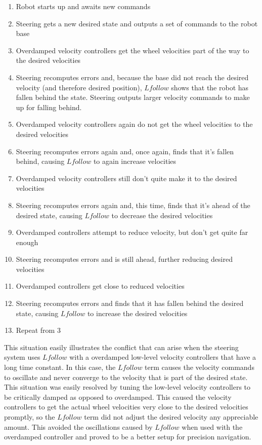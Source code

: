 \begin{enumerate}
\item Robot starts up and awaits new commands
\item Steering gets a new desired state and outputs a set of commands to the robot base
\item Overdamped velocity controllers get the wheel velocities part of the way to the desired velocities
\item Steering recomputes errors and, because the base did not reach the desired velocity (and therefore desired position), $Lfollow$ shows that the robot has fallen behind the state. Steering outputs larger velocity commands to make up for falling behind.
\item Overdamped velocity controllers again do not get the wheel velocities to the desired velocities
\item Steering recomputes errors again and, once again, finds that it's fallen behind, causing $Lfollow$ to again increase velocities
\item Overdamped velocity controllers still don't quite make it to the desired velocities
\item Steering recomputes errors again and, this time, finds that it's ahead of the desired state, causing $Lfollow$ to decrease the desired velocities
\item Overdamped controllers attempt to reduce velocity, but don't get quite far enough
\item Steering recomputes errors and is still ahead, further reducing desired velocities
\item Overdamped controllers get close to reduced velocities
\item Steering recomputes errors and finds that it has fallen behind the desired state, causing $Lfollow$ to increase the desired velocities
\item Repeat from 3
\end{enumerate}

This situation easily illustrates the conflict that can arise when the steering system uses $Lfollow$ with a overdamped low-level velocity controllers that have a long time constant. In this case, the $Lfollow$ term causes the velocity commands to oscillate and never converge to the velocity that is part of the desired state. This situation was easily resolved by tuning the low-level velocity controllers to be critically damped as opposed to overdamped. This caused the velocity controllers to get the actual wheel velocities very close to the desired velocities promptly, so the $Lfollow$ term did not adjust the desired velocity any appreciable amount. This avoided the oscillations caused by $Lfollow$ when used with the overdamped controller and proved to be a better setup for precision navigation.

